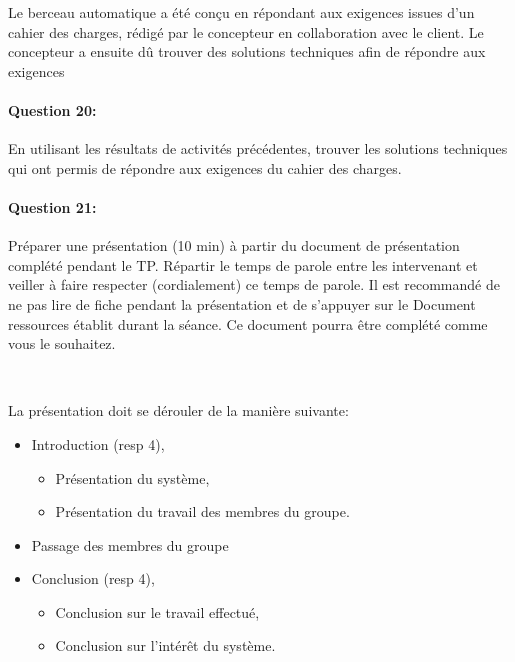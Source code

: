 Le berceau automatique a été conçu en répondant aux exigences issues d'un cahier des charges, rédigé par le concepteur en collaboration avec le client. Le concepteur a ensuite dû trouver des solutions techniques afin de répondre aux exigences 

\paragraph{Question 20:} En utilisant les résultats de activités précédentes, trouver les solutions techniques qui ont permis de répondre aux exigences du cahier des charges. 


\paragraph{Question 21:} Préparer une présentation (10 min) à partir du document de présentation complété pendant le TP. Répartir le temps de parole entre les intervenant et veiller à faire respecter (cordialement) ce temps de parole. Il est recommandé de ne pas lire de fiche pendant la présentation et de s'appuyer sur le \og Document ressources \fg établit durant la séance. Ce document pourra être complété comme vous le souhaitez.

~\

La présentation doit se dérouler de la manière suivante:
\begin{itemize}
 \item Introduction (resp 4),
 \begin{itemize}
 \item Présentation du système,
 \item Présentation du travail des membres du groupe.
 \end{itemize}
 \item Passage des membres du groupe
 \item Conclusion (resp 4),
 \begin{itemize}
 \item Conclusion sur le travail effectué,
 \item Conclusion sur l'intérêt du système.
 \end{itemize}
\end{itemize}




